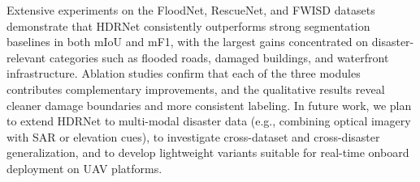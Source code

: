 \documentclass[lettersize,journal]{IEEEtran}
\begin{document}
Extensive experiments on the FloodNet, RescueNet, and FWISD datasets demonstrate that HDRNet consistently outperforms strong segmentation baselines in both mIoU and mF1, with the largest gains concentrated on disaster-relevant categories such as flooded roads, damaged buildings, and waterfront infrastructure. Ablation studies confirm that each of the three modules contributes complementary improvements, and the qualitative results reveal cleaner damage boundaries and more consistent labeling. In future work, we plan to extend HDRNet to multi-modal disaster data (e.g., combining optical imagery with SAR or elevation cues), to investigate cross-dataset and cross-disaster generalization, and to develop lightweight variants suitable for real-time onboard deployment on UAV platforms.






\end{document}
